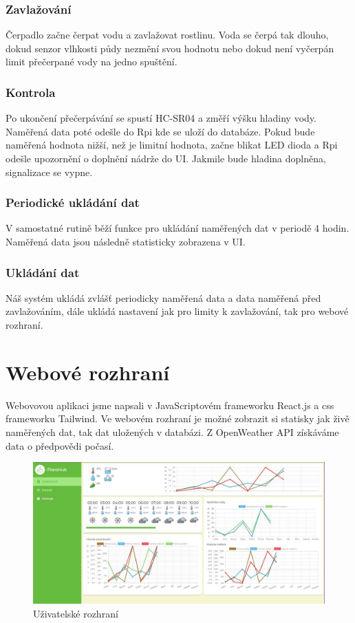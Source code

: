 \documentclass[11pt,a4paper]{article}
\begin{document}
\subsubsection*{Zavlažování}

Čerpadlo začne čerpat vodu a zavlažovat rostlinu. Voda se čerpá tak dlouho, dokud senzor vlhkosti půdy nezmění svou hodnotu nebo dokud není vyčerpán limit přečerpané vody na jedno spuštění.

\subsubsection*{Kontrola}

Po ukončení přečerpávání se spustí HC-SR04 a změří výšku hladiny vody. Naměřená data poté odešle do Rpi kde se uloží do databáze. Pokud bude naměřená hodnota nižší, než je limitní hodnota, začne blikat LED dioda a Rpi odešle upozornění o doplnění nádrže do UI. Jakmile bude hladina doplněna, signalizace se vypne.

\subsubsection*{Periodické ukládání dat}

V samostatné rutině běží funkce pro ukládání naměřených dat v periodě 4 hodin. Naměřená data jsou následně statisticky zobrazena v UI.

\subsubsection*{Ukládání dat}

Náš systém ukládá zvlášť periodicky naměřená data a data naměřená před zavlažováním, dále ukládá nastavení jak pro limity k zavlažování, tak pro webové rozhraní.

\section*{Webové rozhraní}

Webovovou aplikaci jsme napsali v JavaScriptovém frameworku React.js a css frameworku Tailwind. Ve webovém rozhraní je možné zobrazit si statisky jak živě naměřených dat, tak dat uložených v databázi. Z OpenWeather API získáváme data o předpovědi počasí.

\begin{figure}[h]
	\centering
	\includegraphics[width=\linewidth]{web-ui.png}
	\caption*{Uživatelské rozhraní}
\end{figure}
\end{document}
